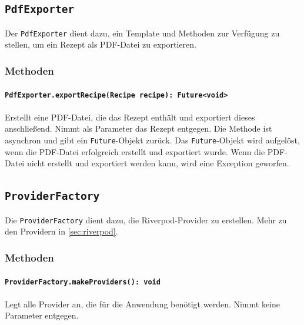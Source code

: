 \documentclass[parskip=full]{scrartcl}
\begin{document}
\subsection{\texttt{PdfExporter}}
Der \texttt{PdfExporter} dient dazu, ein Template und Methoden zur Verfügung zu stellen, um ein Rezept als PDF-Datei zu exportieren.
\subsubsection*{Methoden}
\paragraph{\texttt{PdfExporter.exportRecipe(Recipe recipe): Future<void>}}
Erstellt eine PDF-Datei, die das Rezept enthält und exportiert dieses anschließend. Nimmt als Parameter das Rezept entgegen. Die Methode ist asynchron und gibt ein \texttt{Future}-Objekt zurück. Das \texttt{Future}-Objekt wird aufgelöst, wenn die PDF-Datei erfolgreich erstellt und exportiert wurde. Wenn die PDF-Datei nicht erstellt und exportiert werden kann, wird eine Exception geworfen.
\newpage
\subsection{\texttt{ProviderFactory}}
Die \texttt{ProviderFactory} dient dazu, die Riverpod-Provider zu erstellen. Mehr zu den Providern in \ref{sec:riverpod}.
\subsubsection*{Methoden}
\paragraph{\texttt{ProviderFactory.makeProviders(): void}}
Legt alle Provider an, die für die Anwendung benötigt werden. Nimmt keine Parameter entgegen.
\newpage
\end{document}
